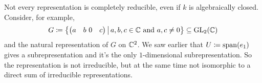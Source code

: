 \begin{rem}
  Not every representation is completely reducible, even if $k$ is algebraically closed.
  Consider, for example,
  \[
    G
    \coloneqq \left\{
                \begin{pmatrix}
                  a & b \
                  0 & c
                \end{pmatrix}
              \,\middle|\,
                a, b, c \in \mathbb{C}
                \text{ and }
                a,c \neq 0
              \right\}
    \subseteq \operatorname{GL}_2(\mathbb{C})
  \]
  and the natural representation of $G$ on $\mathbb{C}^2$. We saw earlier that $U \coloneqq \operatorname{span}(e_1)$ gives a subrepresentation and it’s the only $1$-dimensional subrepresentation.
  So the representation is not irreducible, but at the same time not isomorphic to a direct sum of irreducible representations.
\end{rem}



